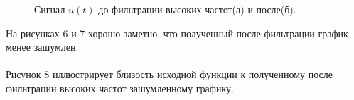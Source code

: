 \documentclass[a5paper, 10pt]{article}
\theoremstyle{definition}
\theoremstyle{plain}
\theoremstyle{remark}
\begin{document}
\begin{figure}[h]
\begin{minipage}[h]{0.5\linewidth}
\end{minipage}
\hfill
\begin{minipage}[h]{0.5\linewidth}
\end{minipage}
\caption{Сигнал $u(t)$ до фильтрации высоких частот(а) и после(б).}
\end{figure}

\newpage
На рисунках 6 и 7 хорошо заметно, что полученный после фильтрации график менее зашумлен.\\
\\
Рисунок 8 иллюстрирует близость исходной функции к полученному после фильтрации высоких частот зашумленному графику.
\end{document}
